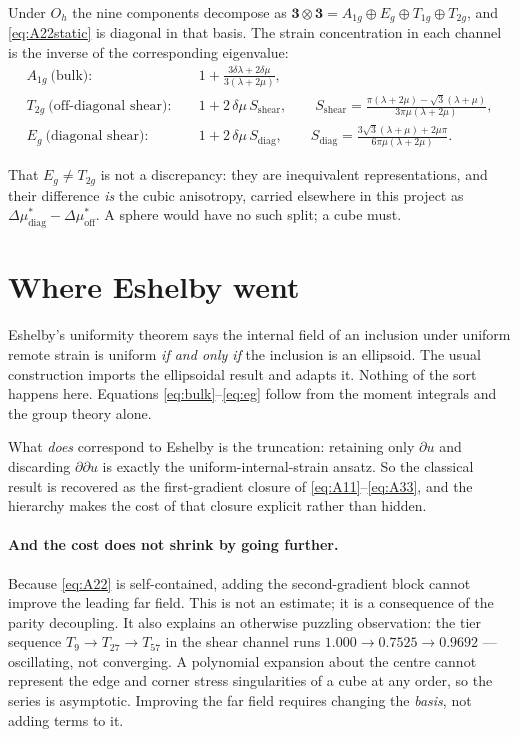 \documentclass[11pt,a4paper]{article}
\newcommand{\D}{\Delta}
\begin{document}
Under $O_h$ the nine components decompose as
$\mathbf{3}\otimes\mathbf{3}=A_{1g}\oplus E_g\oplus T_{1g}\oplus T_{2g}$, and
\eqref{eq:A22static} is diagonal in that basis. The strain concentration in
each channel is the inverse of the corresponding eigenvalue:
\begin{align}
A_{1g}\ \text{(bulk)}: &\quad
  1+\frac{3\delta\lambda+2\delta\mu}{3(\lambda+2\mu)}, \label{eq:bulk}\\[4pt]
T_{2g}\ \text{(off-diagonal shear)}: &\quad
  1+2\,\delta\mu\,S_{\text{shear}},\qquad
  S_{\text{shear}}=\frac{\pi(\lambda+2\mu)-\sqrt3(\lambda+\mu)}
                        {3\pi\mu(\lambda+2\mu)}, \label{eq:t2g}\\[4pt]
E_{g}\ \text{(diagonal shear)}: &\quad
  1+2\,\delta\mu\,S_{\text{diag}},\qquad
  S_{\text{diag}}=\frac{3\sqrt3(\lambda+\mu)+2\mu\pi}
                        {6\pi\mu(\lambda+2\mu)} . \label{eq:eg}
\end{align}

That $E_g\neq T_{2g}$ is not a discrepancy: they are inequivalent
representations, and their difference \emph{is} the cubic anisotropy, carried
elsewhere in this project as $\D\mu^*_{\text{diag}}-\D\mu^*_{\text{off}}$. A
sphere would have no such split; a cube must.

\section{Where Eshelby went}

Eshelby's uniformity theorem says the internal field of an inclusion under
uniform remote strain is uniform \emph{if and only if} the inclusion is an
ellipsoid. The usual construction imports the ellipsoidal result and adapts
it. Nothing of the sort happens here. Equations
\eqref{eq:bulk}--\eqref{eq:eg} follow from the moment integrals and the group
theory alone.

What \emph{does} correspond to Eshelby is the truncation: retaining only
$\partial u$ and discarding $\partial\partial u$ is exactly the
uniform-internal-strain ansatz. So the classical result is recovered as the
first-gradient closure of \eqref{eq:A11}--\eqref{eq:A33}, and the hierarchy
makes the cost of that closure explicit rather than hidden.

\paragraph{And the cost does not shrink by going further.} Because
\eqref{eq:A22} is self-contained, adding the second-gradient block cannot
improve the leading far field. This is not an estimate; it is a consequence of
the parity decoupling. It also explains an otherwise puzzling observation: the
tier sequence $T_9\to T_{27}\to T_{57}$ in the shear channel runs
$1.000\to0.7525\to0.9692$ --- oscillating, not converging. A polynomial
expansion about the centre cannot represent the edge and corner stress
singularities of a cube at any order, so the series is asymptotic. Improving
the far field requires changing the \emph{basis}, not adding terms to it.
\end{document}
